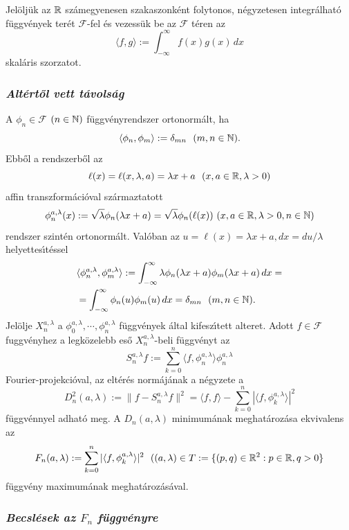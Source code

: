 \documentclass[oneside,titlepage,12pt,a4paper]{report}
\begin{document}
Jel\"olj\"uk az $\Bbb R$ sz\'amegyenesen szakaszonk\'ent folytonos, n\'egyzetesen integr\'alhat\'o f\"uggv\'enyek ter\'et $\mathcal F$-fel \'es vezess\"uk be az $\mathcal F$ t\'eren az
$$
\langle f,g\rangle:=\int_{-\infty}^\infty  f(x)g(x)\,dx
$$
skal\'aris szorzatot.


\subsubsection{\it  Alt\'ert\H ol vett t\'avols\'ag}

A  $\phi_n\in \mathcal F$ $(n\in\Bbb N)$ f\"uggv\'enyrendszer  ortonorm\'alt, ha
$$
\langle \phi_n,\phi_m\rangle:=\delta_{mn}\ \ (m,n\in\Bbb N).
$$
Ebb\H ol a rendszerb\H ol az
$$
\ell(x)=\ell(x,\lambda, a)=\lambda x+a\ \ (x,a\in\Bbb R,\lambda>0)
$$
affin transzform\'aci\'oval sz\'armaztatott
$$
\phi_n^{a,\lambda}(x):=\sqrt \lambda \phi_n(\lambda x+a)=\sqrt \lambda \phi_n(\ell(x)) \ (x,a\in\Bbb R,\lambda>0, n\in\Bbb N)
$$
rendszer szint\'en ortonorm\'alt. Val\'oban az $u=\ell(x)=\lambda x+a, dx=du/\lambda $ helyettes\'\i t\'essel
\begin{equation}
\begin{split}
&\langle \phi_n^{a,\lambda},\phi_m^{a,\lambda}\rangle:=
\int_{-\infty}^\infty\lambda \phi_n(\lambda x+a)\phi_m(\lambda x+a)\, dx=\\
&=\int_{-\infty}^\infty \phi_n(u)\phi_m(u)\, dx=
\delta_{mn}\ \ (m,n\in\Bbb N).
\end{split}
\end{equation}
Jel\"olje  $X_n^{a,\lambda}$ a $\phi_0^{a,\lambda},\cdots,\phi_n^{a,\lambda}$ f\"uggv\'enyek \'altal kifesz\'\i tett alteret. Adott $f\in \mathcal F$ fuggv\'enyhez a legk\"ozelebb es\H o $X_n^{a,\lambda}$-beli f\"uggv\'enyt az
$$
S_n^{a,\lambda}f:=\sum_{k=0}^n \langle f,\phi_n^{a,\lambda}\rangle\phi_n^{a,\lambda}
$$
Fourier-projekci\'oval, az elt\'er\'es norm\'aj\'anak a  n\'egyzete  a
$$
D_n^2(a,\lambda):=\|f-S_n^{a,\lambda}f\|^2=\langle f,f\rangle-\sum_{k=0}^n |\langle f,\phi_k^{a,\lambda}\rangle|^2
$$
f\"uggv\'ennyel adhat\'o meg. A $D_n(a,\lambda)$ minimum\'anak meghat\'aroz\'asa ekvivalens az
$$
F_n(a,\lambda):=\sum_{k=0}^n |\langle f,\phi_k^{a,\lambda}\rangle|^2\ \
((a,\lambda)\in T:=\{(p,q)\in\Bbb R^2:p\in\Bbb R, q>0\}
$$
f\"uggv\'eny maximum\'anak meghat\'aroz\'as\'aval.

\subsubsection{\it  Becsl\'esek az $F_n$ f\"uggv\'enyre}
\end{document}
